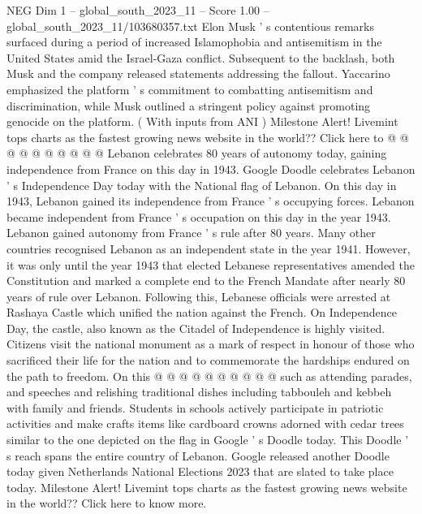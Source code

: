 \begin{textsample}{NEG Dim 1 – global\_south\_2023\_11 – Score 1.00 – global\_south\_2023\_11/103680357.txt}
Elon Musk ' s contentious remarks surfaced during a period of increased Islamophobia and antisemitism in the United States amid the Israel-Gaza conflict.
Subsequent to the backlash, both Musk and the company released statements addressing the fallout.
Yaccarino emphasized the platform ' s commitment to combatting antisemitism and discrimination, while Musk outlined a stringent policy against promoting genocide on the platform. ( With inputs from ANI ) Milestone Alert!
Livemint tops charts as the fastest growing news website in the world??
Click here to @ @ @ @ @ @ @ @ @ @ Lebanon celebrates 80 years of autonomy today, gaining independence from France on this day in 1943.
Google Doodle celebrates Lebanon ' s Independence Day today with the National flag of Lebanon.
On this day in 1943, Lebanon gained its independence from France ' s occupying forces.
Lebanon became independent from France ' s occupation on this day in the year 1943.
Lebanon gained autonomy from France ' s rule after 80 years.
Many other countries recognised Lebanon as an independent state in the year 1941.
However, it was only until the year 1943 that elected Lebanese representatives amended the Constitution and marked a complete end to the French Mandate after nearly 80 years of rule over Lebanon.
Following this, Lebanese officials were arrested at Rashaya Castle which unified the nation against the French.
On Independence Day, the castle, also known as the Citadel of Independence is highly visited.
Citizens visit the national monument as a mark of respect in honour of those who sacrificed their life for the nation and to commemorate the hardships endured on the path to freedom.
On this @ @ @ @ @ @ @ @ @ @ such as attending parades, and speeches and relishing traditional dishes including tabbouleh and kebbeh with family and friends.
Students in schools actively participate in patriotic activities and make crafts items like cardboard crowns adorned with cedar trees similar to the one depicted on the flag in Google ' s Doodle today.
This Doodle ' s reach spans the entire country of Lebanon.
Google released another Doodle today given Netherlands National Elections 2023 that are slated to take place today.
Milestone Alert!
Livemint tops charts as the fastest growing news website in the world??
Click here to know more.

\end{textsample}
